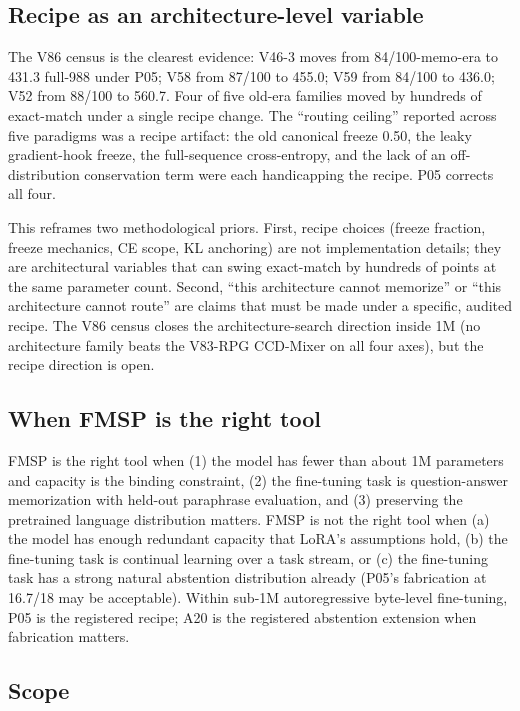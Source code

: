 \documentclass[11pt]{article}
\begin{document}
\subsection{Recipe as an architecture-level variable}

The V86 census is the clearest evidence: V46-3 moves from 84/100-memo-era to 431.3 full-988 under P05; V58 from 87/100 to 455.0; V59 from 84/100 to 436.0; V52 from 88/100 to 560.7. Four of five old-era families moved by hundreds of exact-match under a single recipe change. The ``routing ceiling'' reported across five paradigms was a recipe artifact: the old canonical freeze 0.50, the leaky gradient-hook freeze, the full-sequence cross-entropy, and the lack of an off-distribution conservation term were each handicapping the recipe. P05 corrects all four.

This reframes two methodological priors. First, recipe choices (freeze fraction, freeze mechanics, CE scope, KL anchoring) are not implementation details; they are architectural variables that can swing exact-match by hundreds of points at the same parameter count. Second, ``this architecture cannot memorize'' or ``this architecture cannot route'' are claims that must be made under a specific, audited recipe. The V86 census closes the architecture-search direction inside 1M (no architecture family beats the V83-RPG CCD-Mixer on all four axes), but the recipe direction is open.

\subsection{When FMSP is the right tool}

FMSP is the right tool when (1) the model has fewer than about 1M parameters and capacity is the binding constraint, (2) the fine-tuning task is question-answer memorization with held-out paraphrase evaluation, and (3) preserving the pretrained language distribution matters. FMSP is not the right tool when (a) the model has enough redundant capacity that LoRA's assumptions hold, (b) the fine-tuning task is continual learning over a task stream, or (c) the fine-tuning task has a strong natural abstention distribution already (P05's fabrication at 16.7/18 may be acceptable). Within sub-1M autoregressive byte-level fine-tuning, P05 is the registered recipe; A20 is the registered abstention extension when fabrication matters.

\subsection{Scope}
\end{document}
